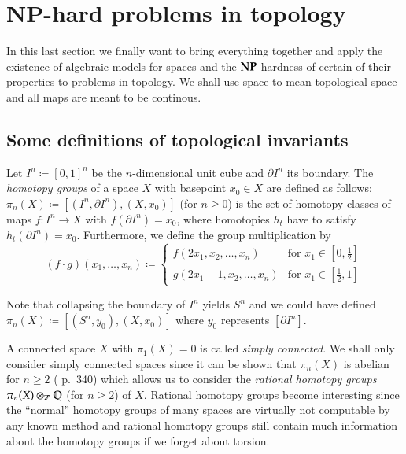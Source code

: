 \section{NP-hard problems in topology}

In this last section we finally want to bring everything together and apply the existence of algebraic
models for spaces and the $\mathbf{NP}$-hardness of certain of their properties to problems in topology.
We shall use space to mean topological space and all maps are meant to be continous.

\subsection{Some definitions of topological invariants}


\begin{Definition}
 Let $I^n \coloneqq [0,1]^n$ be the $n$-dimensional unit cube and $\partial I^n$ its boundary.
 The \emph{homotopy groups} of a space $X$ with basepoint $x_0 \in X$ are defined as follows: \newline
 $\pi_n(X) \coloneqq [(I^n, \partial I^n), (X,x_0) ]$ (for $n \geq 0$) is the set of homotopy classes of maps
 $f \colon I^n \to X$ with $f(\partial I^n) = x_0$, where homotopies $h_t$ have to satisfy $h_t(\partial I^n) = x_0$.
 Furthermore, we define the group multiplication by 
 $$ (f \cdot g) (x_1, \ldots, x_n) \coloneqq 
 \begin{cases}
  f(2x_1, x_2, \ldots, x_n) &\text{for $x_1 \in [0, \frac{1}{2}]$} \\
 
  g(2x_1 - 1, x_2, \ldots, x_n) &\text{for $x_1 \in [ \frac{1}{2}, 1]$}
 \end{cases}
$$
\end{Definition}

Note that collapsing the boundary of $I^n$ yields $S^n$ and we could have defined 
$\pi_n(X) \coloneqq [ (S^n, y_0), (X,x_0)]$ where $y_0$ represents $[\partial I^n]$.

\begin{Remark}
 A connected space $X$ with $\pi_1(X) = 0$ is called \emph{simply connected}. We shall only consider
 simply connected spaces since it can be shown that $\pi_n (X)$ is abelian for $n \geq 2$ 
 (\cite{SWB-334616069} p.\ 340)
 which allows us to consider the \emph{rational homotopy groups}
 $ \pi_n(X) \otimes_{\mathbb{Z}} \mathbb{Q}$ (for $n \geq 2$) of $X$. Rational homotopy groups become interesting since the ``normal''
 homotopy groups of many spaces are virtually not computable by any known method and rational homotopy groups
 still contain much information about the homotopy groups if we forget about torsion.
\end{Remark}

